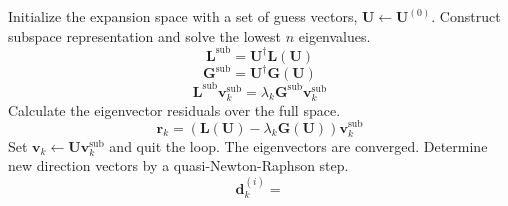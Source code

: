 \begin{algorithm}
    \caption{%
        Canonical multiroot Davidson algorithm for a generalized non-symmetric
        eigenvalue problem,
        $\mathbf{L}\mathbf{v}_k=\lambda_k\mathbf{G}\mathbf{v}_k$, with periodic
        subspace collapse.
        Requires linear transformation functions and diagonal approximations
        (indicated by tildes) for \(\mathbf{L}\) and \(\mathbf{G}\)
        and solves for the lowest \(n\) eigenvalues and eigenvectors.
    }
    \label{algo:davidson}
    \begin{algorithmic}[1]
        \State
        Initialize the expansion space with a set of guess vectors,
        \(\mathbf{U}\leftarrow\mathbf{U}^{(0)}\).
            \State
            Construct subspace representation and solve the lowest \(n\)
            eigenvalues.
            \[
                \mathbf{L}^\mathrm{sub}
                =
                \mathbf{U}^\dagger
                \mathbf{L}(\mathbf{U})
            \]
            \[
                \mathbf{G}^\mathrm{sub}
                =
                \mathbf{U}^\dagger
                \mathbf{G}(\mathbf{U})
            \]
            \[
                \mathbf{L}^\mathrm{sub}
                \mathbf{v}_k^\mathrm{sub}
                =
                \lambda_k
                \mathbf{G}^\mathrm{sub}
                \mathbf{v}_k^\mathrm{sub}
            \]
            \State
            Calculate the eigenvector residuals over the full space.
            \[
                \mathbf{r}_k
                =
                (
                    \mathbf{L}(\mathbf{U})
                    -
                    \lambda_k
                    \mathbf{G}(\mathbf{U})
                )
                \mathbf{v}_k^\mathrm{sub}
            \]
                \State
                Set
                \(\mathbf{v}_k\leftarrow\mathbf{U}\mathbf{v}_k^\mathrm{sub}\)
                and quit the loop.  The eigenvectors are converged.
            \EndIf
            \State
            Determine new direction vectors by a quasi-Newton-Raphson step.
            \[
                \mathbf{d}_k^{(i)}
                =
\]
\end{algorithmic}
\end{algorithm}
